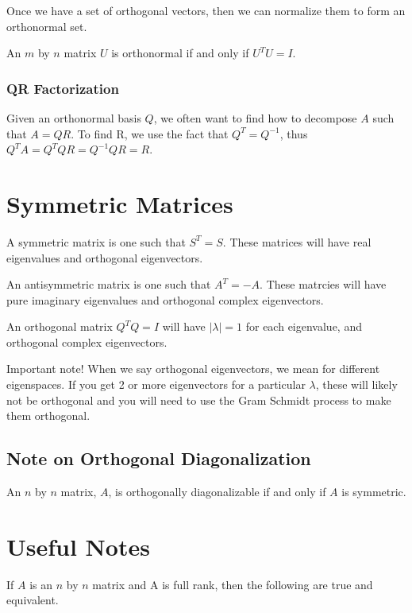 \documentclass[10pt,landscape,a4paper]{article}
\begin{document}
\begin{multicols*}{3}
  Once we have a set of orthogonal vectors, then we can normalize them to form an
  orthonormal set.

  An $m$ by $n$ matrix $U$ is orthonormal if and only if $U^TU = I$.
  
  \subsubsection{QR Factorization}
  Given an orthonormal basis $Q$, we often want to find how to decompose $A$
  such that $A = QR$. To find R, we use the fact that $Q^T = Q^{-1}$, thus $Q^TA
  = Q^TQR = Q^{-1}QR = R$. 


  \section{Symmetric Matrices}
  A symmetric matrix is one such that $S^T = S$. These matrices will have real
  eigenvalues and orthogonal eigenvectors.

  An antisymmetric matrix is one such that $A^T = -A$. These matrcies will have
  pure imaginary eigenvalues and orthogonal complex eigenvectors.

  An orthogonal matrix $Q^TQ = I$ will have $|\lambda| = 1$ for each eigenvalue,
  and orthogonal complex eigenvectors.

  Important note! When we say orthogonal eigenvectors, we mean for different
  eigenspaces. If you get 2 or more eigenvectors for a particular $\lambda$,
  these will likely not be orthogonal and you will need to use the Gram Schmidt
  process to make them orthogonal.

  \subsection{Note on Orthogonal Diagonalization}

  An $n$ by $n$ matrix, $A$, is orthogonally diagonalizable if and only if $A$
  is symmetric.

  \section{Useful Notes}
  If $A$ is an $n$ by $n$ matrix and A is full rank, then the following are true
  and equivalent.


\end{multicols*}
\end{document}
